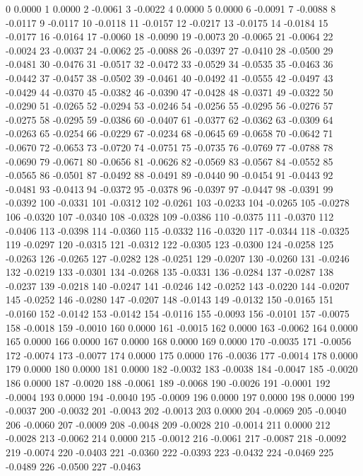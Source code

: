0 0.0000
1 0.0000
2 -0.0061
3 -0.0022
4 0.0000
5 0.0000
6 -0.0091
7 -0.0088
8 -0.0117
9 -0.0117
10 -0.0118
11 -0.0157
12 -0.0217
13 -0.0175
14 -0.0184
15 -0.0177
16 -0.0164
17 -0.0060
18 -0.0090
19 -0.0073
20 -0.0065
21 -0.0064
22 -0.0024
23 -0.0037
24 -0.0062
25 -0.0088
26 -0.0397
27 -0.0410
28 -0.0500
29 -0.0481
30 -0.0476
31 -0.0517
32 -0.0472
33 -0.0529
34 -0.0535
35 -0.0463
36 -0.0442
37 -0.0457
38 -0.0502
39 -0.0461
40 -0.0492
41 -0.0555
42 -0.0497
43 -0.0429
44 -0.0370
45 -0.0382
46 -0.0390
47 -0.0428
48 -0.0371
49 -0.0322
50 -0.0290
51 -0.0265
52 -0.0294
53 -0.0246
54 -0.0256
55 -0.0295
56 -0.0276
57 -0.0275
58 -0.0295
59 -0.0386
60 -0.0407
61 -0.0377
62 -0.0362
63 -0.0309
64 -0.0263
65 -0.0254
66 -0.0229
67 -0.0234
68 -0.0645
69 -0.0658
70 -0.0642
71 -0.0670
72 -0.0653
73 -0.0720
74 -0.0751
75 -0.0735
76 -0.0769
77 -0.0788
78 -0.0690
79 -0.0671
80 -0.0656
81 -0.0626
82 -0.0569
83 -0.0567
84 -0.0552
85 -0.0565
86 -0.0501
87 -0.0492
88 -0.0491
89 -0.0440
90 -0.0454
91 -0.0443
92 -0.0481
93 -0.0413
94 -0.0372
95 -0.0378
96 -0.0397
97 -0.0447
98 -0.0391
99 -0.0392
100 -0.0331
101 -0.0312
102 -0.0261
103 -0.0233
104 -0.0265
105 -0.0278
106 -0.0320
107 -0.0340
108 -0.0328
109 -0.0386
110 -0.0375
111 -0.0370
112 -0.0406
113 -0.0398
114 -0.0360
115 -0.0332
116 -0.0320
117 -0.0344
118 -0.0325
119 -0.0297
120 -0.0315
121 -0.0312
122 -0.0305
123 -0.0300
124 -0.0258
125 -0.0263
126 -0.0265
127 -0.0282
128 -0.0251
129 -0.0207
130 -0.0260
131 -0.0246
132 -0.0219
133 -0.0301
134 -0.0268
135 -0.0331
136 -0.0284
137 -0.0287
138 -0.0237
139 -0.0218
140 -0.0247
141 -0.0246
142 -0.0252
143 -0.0220
144 -0.0207
145 -0.0252
146 -0.0280
147 -0.0207
148 -0.0143
149 -0.0132
150 -0.0165
151 -0.0160
152 -0.0142
153 -0.0142
154 -0.0116
155 -0.0093
156 -0.0101
157 -0.0075
158 -0.0018
159 -0.0010
160 0.0000
161 -0.0015
162 0.0000
163 -0.0062
164 0.0000
165 0.0000
166 0.0000
167 0.0000
168 0.0000
169 0.0000
170 -0.0035
171 -0.0056
172 -0.0074
173 -0.0077
174 0.0000
175 0.0000
176 -0.0036
177 -0.0014
178 0.0000
179 0.0000
180 0.0000
181 0.0000
182 -0.0032
183 -0.0038
184 -0.0047
185 -0.0020
186 0.0000
187 -0.0020
188 -0.0061
189 -0.0068
190 -0.0026
191 -0.0001
192 -0.0004
193 0.0000
194 -0.0040
195 -0.0009
196 0.0000
197 0.0000
198 0.0000
199 -0.0037
200 -0.0032
201 -0.0043
202 -0.0013
203 0.0000
204 -0.0069
205 -0.0040
206 -0.0060
207 -0.0009
208 -0.0048
209 -0.0028
210 -0.0014
211 0.0000
212 -0.0028
213 -0.0062
214 0.0000
215 -0.0012
216 -0.0061
217 -0.0087
218 -0.0092
219 -0.0074
220 -0.0403
221 -0.0360
222 -0.0393
223 -0.0432
224 -0.0469
225 -0.0489
226 -0.0500
227 -0.0463
